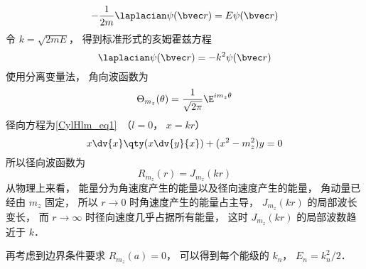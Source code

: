 
\begin{issues}
\issueDraft
\end{issues}


\begin{equation}
-\frac{1}{2m}\laplacian \psi(\bvec r) = E\psi(\bvec r)
\end{equation}
令 $k = \sqrt{2mE}$， 得到标准形式的亥姆霍兹方程
\begin{equation}
\laplacian \psi(\bvec r) = -k^2\psi(\bvec r)
\end{equation}
使用分离变量法， 角向波函数为
\begin{equation}
\Theta_{m_z}(\theta) = \frac{1}{\sqrt{2\pi}} \E^{im_z \theta}
\end{equation}
径向方程为\autoref{CylHlm_eq1}~（$l = 0$， $x = kr$）
\begin{equation}
x \dv{x} \qty(x\dv{y}{x}) + (x^2 - m_z^2)y = 0
\end{equation}
所以径向波函数为
\begin{equation}
R_{m_z}(r) = J_{m_z}(kr)
\end{equation}
从物理上来看， 能量分为角速度产生的能量以及径向速度产生的能量， 角动量已经由 $m_z$ 固定， 所以 $r \to 0$ 时角速度产生的能量占主导， $J_{m_z}(kr)$ 的局部波长变长， 而 $r\to \infty$ 时径向速度几乎占据所有能量， 这时 $J_{m_z}(kr)$ 的局部波数趋近于 $k$．

再考虑到边界条件要求 $R_{m_z}(a)  = 0$， 可以得到每个能级的 $k_n$， $E_n = k_n^2/2$．
